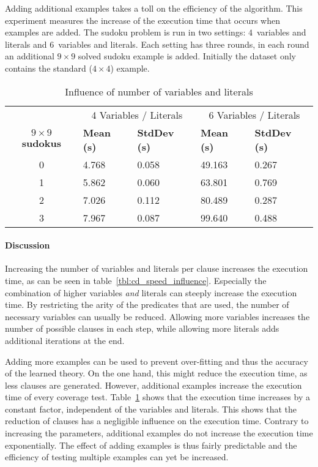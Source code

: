 \begin{experiment}
	Adding additional examples takes a toll on the efficiency of the algorithm.
	This experiment measures the increase of the execution time that occurs when examples are added.
	The sudoku problem is run in two settings: $4$~variables and literals and $6$~variables and literals.
	Each setting has three rounds, in each round an additional $9 \times 9$ solved sudoku example is added.
	Initially the dataset only contains the standard ($4 \times 4$) example.

	\begin{table}[!htp]
		\begin{tabularx}{\textwidth}{c|XX|XX}
			& \multicolumn{2}{c}{4 Variables / Literals} & \multicolumn{2}{c}{6 Variables / Literals} \\
			\textbf{$9 \times 9$ sudokus}	& \textbf{Mean (s)} & \textbf{StdDev (s)} & \textbf{Mean (s)} & \textbf{StdDev (s)} \\
			\toprule
			0 & 4.768 & 0.058	& 49.163	& 0.267	\\
			1 & 5.862 & 0.060	& 63.801	& 0.769	\\
			2 & 7.026 & 0.112	& 80.489	& 0.287	\\
			3 & 7.967 & 0.087	& 99.640	& 0.488	\\
		\end{tabularx}
		\caption{Influence of number of variables and literals}
		\label{tbl:cd_speed_examples}
	\end{table}
\end{experiment}

\paragraph{Discussion}
Increasing the number of variables and literals per clause increases the execution time, as can be seen in table~\ref{tbl:cd_speed_influence}.
Especially the combination of higher variables \emph{and} literals can steeply increase the execution time.
By restricting the arity of the predicates that are used, the number of necessary variables can usually be reduced.
Allowing more variables increases the number of possible clauses in each step, while allowing more literals adds additional iterations at the end.

Adding more examples can be used to prevent over-fitting and thus the accuracy of the learned theory.
On the one hand, this might reduce the execution time, as less clauses are generated.
However, additional examples increase the execution time of every coverage test.
Table~\ref{tbl:cd_speed_examples} shows that the execution time increases by a constant factor, independent of the variables and literals.
This shows that the reduction of clauses has a negligible influence on the execution time.
Contrary to increasing the parameters, additional examples do not increase the execution time exponentially.
The effect of adding examples is thus fairly predictable and the efficiency of testing multiple examples can yet be increased.

